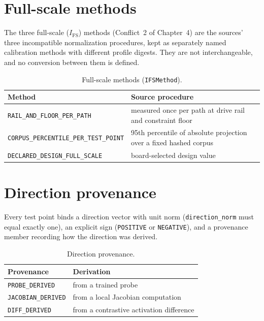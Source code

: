 \section{Full-scale methods}\label{enums:sec:ifs}

The three full-scale ($I_{\mathrm{FS}}$) methods (Conflict~2 of Chapter~4) are the sources' three incompatible normalization procedures, kept as separately named calibration methods with different profile digests. They are not interchangeable, and no conversion between them is defined.

\begin{table}[htbp]
\centering
\caption{Full-scale methods (\texttt{IFSMethod}).}\label{enums:tab:ifs}
\begin{tabular}{@{}ll@{}}
\toprule
Method & Source procedure \\
\midrule
\texttt{RAIL\_AND\_FLOOR\_PER\_PATH} & measured once per path at drive rail and constraint floor \\
\texttt{CORPUS\_PERCENTILE\_PER\_TEST\_POINT} & 95th percentile of absolute projection over a fixed hashed corpus \\
\texttt{DECLARED\_DESIGN\_FULL\_SCALE} & board-selected design value \\
\bottomrule
\end{tabular}
\end{table}

\section{Direction provenance}\label{enums:sec:direction}

Every test point binds a direction vector with unit norm (\texttt{direction\_norm} must equal exactly one), an explicit sign (\texttt{POSITIVE} or \texttt{NEGATIVE}), and a provenance member recording how the direction was derived.

\begin{table}[htbp]
\centering
\caption{Direction provenance.}\label{enums:tab:direction}
\begin{tabular}{@{}ll@{}}
\toprule
Provenance & Derivation \\
\midrule
\texttt{PROBE\_DERIVED} & from a trained probe \\
\texttt{JACOBIAN\_DERIVED} & from a local Jacobian computation \\
\texttt{DIFF\_DERIVED} & from a contrastive activation difference \\
\bottomrule
\end{tabular}
\end{table}

